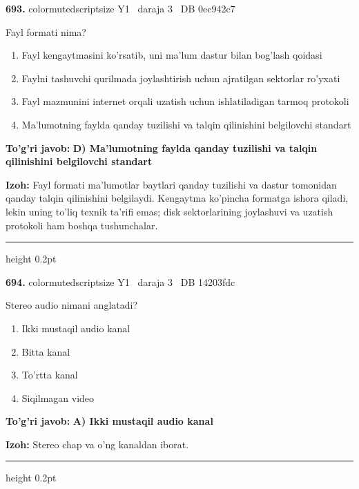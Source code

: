 \documentclass[10pt,a4paper,oneside]{article}
\begin{document}
\noindent\textbf{\color{ink}693.}  {color{muted}scriptsize Y1 \textbullet\ daraja 3 \textbullet\ DB 0ec942c7}
\par
Fayl formati nima?
\begin{enumerate}[label=\Alph*),leftmargin=9mm]
\item Fayl kengaytmasini ko'rsatib, uni ma'lum dastur bilan bog'lash qoidasi
\item Faylni tashuvchi qurilmada joylashtirish uchun ajratilgan sektorlar ro'yxati
\item Fayl mazmunini internet orqali uzatish uchun ishlatiladigan tarmoq protokoli
\item Ma'lumotning faylda qanday tuzilishi va talqin qilinishini belgilovchi standart
\end{enumerate}
\begin{tcolorbox}[enhanced,breakable,colback=teal!4,colframe=teal!50!black,boxrule=0.5pt,arc=1.1mm,left=3mm,right=3mm,top=1.7mm,bottom=1.7mm,before skip=2mm,after skip=2mm]
\textbf{\color{teal}To'g'ri javob:} \textbf{D) Ma'lumotning faylda qanday tuzilishi va talqin qilinishini belgilovchi standart}
\par\smallskip
\textbf{Izoh:} Fayl formati ma'lumotlar baytlari qanday tuzilishi va dastur tomonidan qanday talqin qilinishini belgilaydi. Kengaytma ko'pincha formatga ishora qiladi, lekin uning to'liq texnik ta'rifi emas; disk sektorlarining joylashuvi va uzatish protokoli ham boshqa tushunchalar.
\end{tcolorbox}
\vspace{2mm}\hrule height 0.2pt \vspace{3mm}

\noindent\textbf{\color{ink}694.}  {color{muted}scriptsize Y1 \textbullet\ daraja 3 \textbullet\ DB 14203fdc}
\par
Stereo audio nimani anglatadi?
\begin{enumerate}[label=\Alph*),leftmargin=9mm]
\item Ikki mustaqil audio kanal
\item Bitta kanal
\item To'rtta kanal
\item Siqilmagan video
\end{enumerate}
\begin{tcolorbox}[enhanced,breakable,colback=teal!4,colframe=teal!50!black,boxrule=0.5pt,arc=1.1mm,left=3mm,right=3mm,top=1.7mm,bottom=1.7mm,before skip=2mm,after skip=2mm]
\textbf{\color{teal}To'g'ri javob:} \textbf{A) Ikki mustaqil audio kanal}
\par\smallskip
\textbf{Izoh:} Stereo chap va o'ng kanaldan iborat.
\end{tcolorbox}
\vspace{2mm}\hrule height 0.2pt \vspace{3mm}
\end{document}
